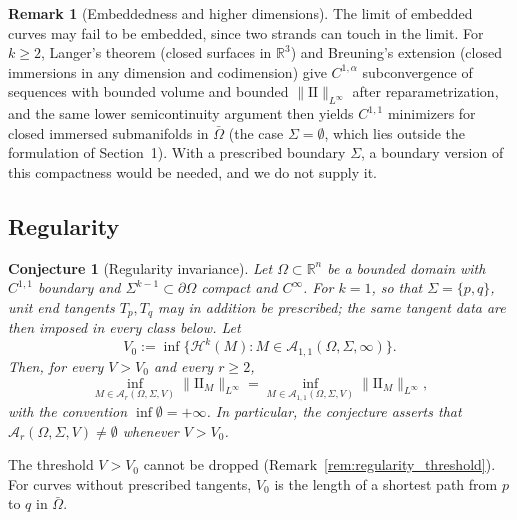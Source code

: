\documentclass[11pt,reqno]{amsart}
\newtheorem{conjecture}[theorem]{Conjecture}
\theoremstyle{definition}
\newtheorem{remark}[theorem]{Remark}
\providecommand{\R}{\mathbb{R}}
\providecommand{\II}{\mathrm{I\!I}}
\providecommand{\Hsn}{\mathcal{H}}
\numberwithin{equation}{section}
\providecommand{\II}{\mathrm{II}}
\providecommand{\R}{\mathbb{R}}
\providecommand{\Hsn}{\mathcal{H}}
\begin{document}
\begin{remark}[Embeddedness and higher dimensions]
The limit of embedded curves may fail to be embedded, since two strands can touch in the limit. For $k \ge 2$, Langer's theorem \cite{langer1985} (closed surfaces in $\R^3$) and Breuning's extension \cite{breuning2015} (closed immersions in any dimension and codimension) give $C^{1,\alpha}$ subconvergence of sequences with bounded volume and bounded $\|\II\|_{L^\infty}$ after reparametrization, and the same lower semicontinuity argument then yields $C^{1,1}$ minimizers for closed immersed submanifolds in $\bar\Omega$ (the case $\Sigma = \emptyset$, which lies outside the formulation of Section~1). With a prescribed boundary $\Sigma$, a boundary version of this compactness would be needed, and we do not supply it.
\end{remark}

\subsection{Regularity}

\begin{conjecture}[Regularity invariance]
\label{thm:regularity_invariance}
Let $\Omega \subset \R^n$ be a bounded domain with $C^{1,1}$ boundary and $\Sigma^{k-1} \subset \partial\Omega$ compact and $C^\infty$. For $k = 1$, so that $\Sigma = \{p, q\}$, unit end tangents $T_p, T_q$ may in addition be prescribed; the same tangent data are then imposed in every class below. Let
\begin{equation}
\label{eq:volume_threshold}
V_0 := \inf\big\{ \Hsn^k(M) : M \in \mathcal{A}_{1,1}(\Omega, \Sigma, \infty) \big\}.
\end{equation}
Then, for every $V > V_0$ and every $r \ge 2$,
\begin{equation}
\inf_{M \in \mathcal{A}_r(\Omega, \Sigma, V)} \|\II_M\|_{L^\infty} = \inf_{M \in \mathcal{A}_{1,1}(\Omega, \Sigma, V)} \|\II_M\|_{L^\infty},
\end{equation}
with the convention $\inf \emptyset = +\infty$. In particular, the conjecture asserts that $\mathcal{A}_r(\Omega, \Sigma, V) \neq \emptyset$ whenever $V > V_0$.
\end{conjecture}

The threshold $V > V_0$ cannot be dropped (Remark~\ref{rem:regularity_threshold}). For curves without prescribed tangents, $V_0$ is the length of a shortest path from $p$ to $q$ in $\bar\Omega$.
\end{document}
